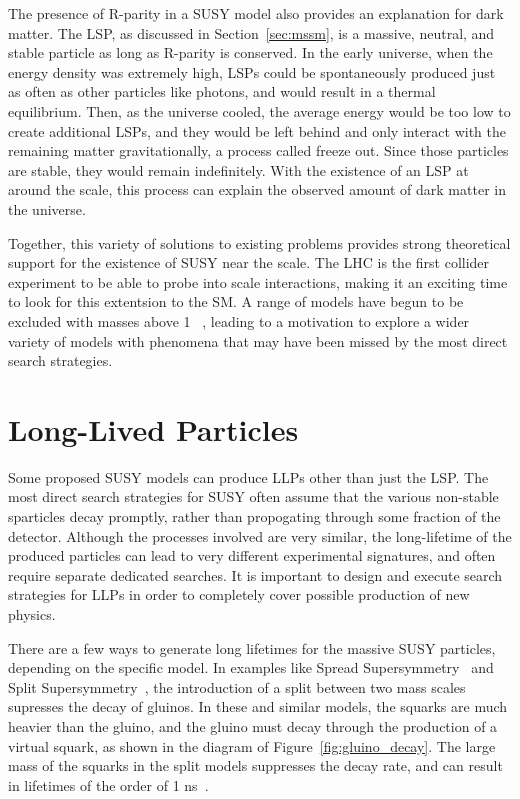 The presence of R-parity in a \ac{SUSY} model also provides an explanation for dark matter.
The \ac{LSP}, as discussed in Section~\ref{sec:mssm}, is a massive, neutral, and stable particle as long as R-parity is conserved.
In the early universe, when the energy density was extremely high, \acp{LSP} could be spontaneously produced just as often as other particles like photons, and would result in a thermal equilibrium.
Then, as the universe cooled, the average energy would be too low to create additional \acp{LSP}, and they would be left behind and only interact with the remaining matter gravitationally, a process called freeze out.
Since those particles are stable, they would remain indefinitely. 
With the existence of an \ac{LSP} at around the \TeV scale, this process can explain the observed amount of dark matter in the universe.

Together, this variety of solutions to existing problems provides strong theoretical support for the existence of \ac{SUSY} near the \TeV scale.
The \ac{LHC} is the first collider experiment to be able to probe into \TeV scale interactions, making it an exciting time to look for this extentsion to the \ac{SM}.
A range of models have begun to be excluded with masses above 1 \TeV~\cite{pdg}, leading to a motivation to explore a wider variety of models with phenomena that may have been missed by the most direct search strategies.

\section{Long-Lived Particles}
\label{sec:llp_theory}

Some proposed \ac{SUSY} models can produce \acp{LLP} other than just the \ac{LSP}.
The most direct search strategies for \ac{SUSY} often assume that the various non-stable sparticles decay promptly, rather than propogating through some fraction of the detector.
Although the processes involved are very similar, the long-lifetime of the produced particles can lead to very different experimental signatures, and often require separate dedicated searches.
It is important to design and execute search strategies for \acp{LLP} in order to completely cover possible production of new physics. 

There are a few ways to generate long lifetimes for the massive \ac{SUSY} particles, depending on the specific model.
In examples like Spread Supersymmetry~\cite{spreadsusy} and Split Supersymmetry~\cite{split1,split2}, the introduction of a split between two mass scales supresses the decay of gluinos.
In these and similar models, the squarks are much heavier than the gluino, and the gluino must decay through the production of a virtual squark, as shown in the diagram of Figure~\ref{fig:gluino_decay}.
The large mass of the squarks in the split models suppresses the decay rate, and can result in lifetimes of the order of 1 ns~\cite{spreadsusy}.

